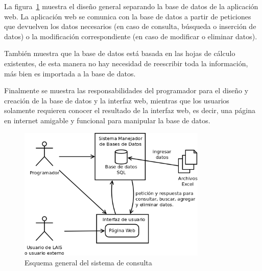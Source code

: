 \documentclass[10pt,letterpaper]{article}
\begin{document}
La figura~\ref{fig:esquema_general} muestra el diseño general separando la base de datos de la aplicación web. La aplicación web se comunica con la base de datos a partir de peticiones que devuelven los datos necesarios (en caso de consulta, búsqueda o inserción de datos) o la modificación correspondiente (en caso de modificar o eliminar datos).

También muestra que la base de datos está basada en las hojas de cálculo existentes, de esta manera no hay necesidad de reescribir toda la información, más bien es importada a la base de datos.

Finalmente se muestra las responsabilidades del programador para el diseño y creación de la base de datos y la interfaz web, mientras que los usuarios solamente requieren conocer el resultado de la interfaz web, es decir, una página en internet amigable y funcional para manipular la base de datos.

\begin{figure}[H]
	\centering
	\includegraphics[width=0.8\textwidth]{EsquemaGeneral.png}
	\caption{Esquema general del sistema de consulta}
	\label{fig:esquema_general}
\end{figure}
\end{document}
